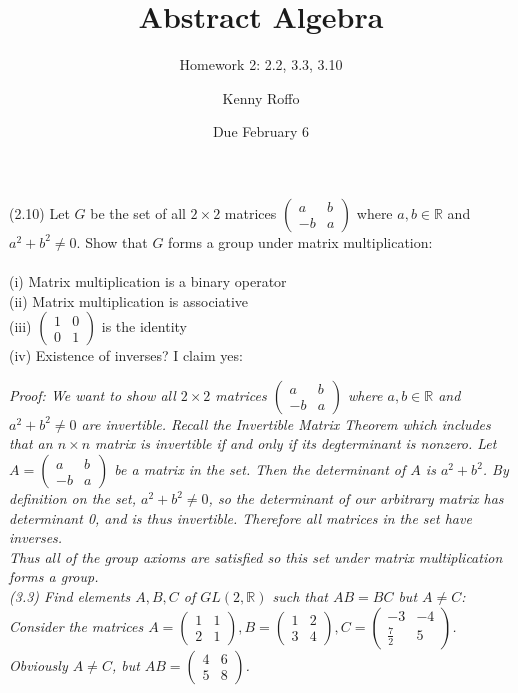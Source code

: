 \documentclass{scrartcl}
\title{Abstract Algebra}
\subtitle{Homework 2: 2.2, 3.3, 3.10}
\author{Kenny Roffo}
\date{Due February 6}
\begin{document}
\maketitle

(2.10) Let $G$ be the set of all $2\times 2$ matrices $\begin{pmatrix} a & b \\ -b & a \end{pmatrix}$ where $a,b \in \mathbb{R}$ and $a^2 + b^2\ne 0$. Show that $G$ forms a group under matrix multiplication:\\\\
    (i) Matrix multiplication is a binary operator \checkmark\\
    (ii) Matrix multiplication is associative \checkmark\\
    (iii) $\begin{pmatrix} 1 & 0 \\ 0 & 1 \end{pmatrix}$ is the identity \checkmark\\
    (iv) Existence of inverses? I claim yes:

\em Proof: \em We want to show all $2\times 2$ matrices $\begin{pmatrix} a & b \\ -b & a \end{pmatrix}$ where $a,b \in \mathbb{R}$ and $a^2 + b^2\ne 0$ are invertible. Recall the Invertible Matrix Theorem which includes that an $n\times n$ matrix is invertible if and only if its degterminant is nonzero. Let $A=\begin{pmatrix} a & b \\ -b & a \end{pmatrix}$ be a matrix in the set. Then the determinant of $A$ is $a^2+b^2$. By definition on the set, $a^2+b^2\ne 0$, so the determinant of our arbitrary matrix has determinant 0, and is thus invertible. Therefore all matrices in the set have inverses.\\

Thus all of the group axioms are satisfied so this set under matrix multiplication forms a group.\\

(3.3) Find elements $A, B, C$ of $GL(2,\mathbb{R})$ such that $AB=BC$ but $A\ne C$:
    Consider the matrices $A=\begin{pmatrix} 1 & 1 \\ 2 & 1 \end{pmatrix}, B=\begin{pmatrix} 1 & 2 \\ 3 & 4 \end{pmatrix}, C=\begin{pmatrix} -3 & -4 \\ \frac{7}{2} & 5\end{pmatrix}$. Obviously $A\ne C$, but $AB=\begin{pmatrix} 4 & 6 \\ 5 & 8 \end{pmatrix}$.\\
\end{document}
